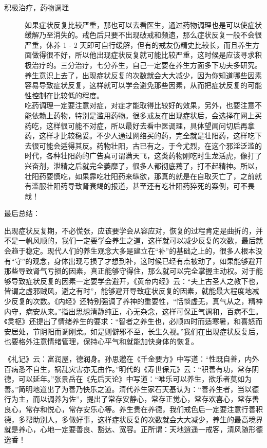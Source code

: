 \documentclass[fontset=founder]{ctexart}
\begin{document}
\begin{description}
    \item[积极治疗，药物调理] 如果症状反复比较严重，那也可以去看医生，通过药物调理也是可以使症状缓解乃至消失的。戒色后只要不出现破戒和频遗，那么症状反复一般不会很严重，休养 1 - 2 天即可自行缓解，但有的戒友伤精史比较长，而且养生方面做得很不好，所以他出现症状反复就可能比较严重，这时候是应该寻求积极治疗的。三分治疗，七分养生，自己一定要在养生方面多下功夫多研究。养生意识上去了，出现症状反复的次数就会大大减少，因为你知道哪些因素容易导致症状反复，这样就可以学会避免那些因素，从而把症状反复的可能性控制在比较低的程度。\\ 吃药调理一定要注意对症，对症才能取得比较好的效果，另外，也要注意不能依赖上药物，特别是滥用药物。很多戒友在出现症状后，会选择在网上买药吃，这样很可能不对症，所以最好去看中医调理，具体望闻问切后再拿药，这样才比较稳妥。不少人通过网络买的药，完全就是壮阳药，这样吃下去很可能会适得其反。药物壮阳，古已有之，于今尤烈，在这个邪淫泛滥的时代，各种壮阳药的广告真可谓满天飞，这类药物刚吃时生龙活虎，像打了兴奋剂，泄精之后就完全萎靡了，很多人都彻底蔫了，打不起精神。所以，壮阳药要慎吃，如果靠吃壮阳药来纵欲，那真的就是在自取灭亡了，之前就有滥服壮阳药导致肾衰竭的报道，甚至还有吃壮阳药猝死的案例，可不畏哉！
\end{description}

最后总结：

出现症状反复期，不必慌张，应该要学会从容应对，恢复的过程肯定是曲折的，并不是一帆风顺的，我们一定要学会养生之道，这样就可以减少反复的次数，最后就会趋于稳定。现代人们的养生观念大多是建立在“补”的基础之上的，很多人根本没有“守”的观念，身体出现亏损了才想到补，这时候已经有点被动了，如果能够避开那些导致肾气亏损的因素，真正能够守得住，那么就可以完全掌握主动权。对于能够导致症状反复的因素一定要学会避开，《黄帝内经》云：“夫上古圣人之教下也，皆谓之虚邪贼风，避之有时”，能够避开导致症状反复的因素，就能最大程度地减少反复的次数。《内经》还特别强调了养神的重要性，“恬惔虚无，真气从之，精神内守，病安从来。”指出思想清静纯正，心无杂念，这样可保正气调和，百病不生。《灵枢》还提出了情绪养生的要求：“智者之养生也，必顺四时而适寒暑，和喜怒而安居处，节阴阳而调刚柔。如是则僻邪不至，长生久视。”我们在出现症状反复后，也要格外注意情绪管理，保持心平气和就能加快身体的恢复。

《礼记》云：富润屋，德润身。孙思邈在《千金要方》中写道：“性既自善，内外百病悉不自生，祸乱灾害亦无由作。”明代的《寿世保元》云：“积善有功，常存阴德，可以延年。”张景岳在《先后天论》中写道：“唯乐可以养生，欲乐者莫如为善。”简明地道出了为善乃快乐之道。清代养生家石天基认为：“善养生者，当以德行为主，而以调养为佐”，提出了常存安静心，常存正觉心，常存欢喜心，常存善良心，常存和悦心，常存安乐心等。养生贵在养德，我们戒色后一定要注意行善积德，多帮助别人，多做好事，这样症状反复的次数就会大大减少，养生的最高境界就是养心，心地一定要善良、豁达、宽容。正所谓：天地逍遥一戒客，清风随形德逸香！
\end{document}
